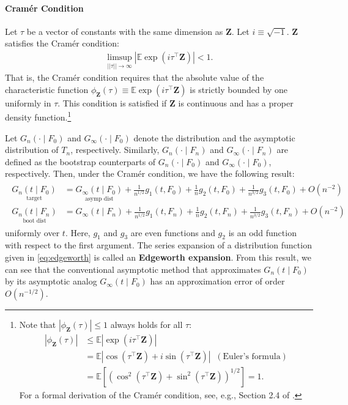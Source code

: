 \documentclass[10.5pt, A4paper, openany, uplatex]{book}
\newcommand{\mbf}{\mathbf}
\newcommand{\E}{\mathbb{E}}
\numberwithin{equation}{section}
\begin{document}
\paragraph{Cram\'{e}r Condition} 
Let $\tau$ be a vector of constants with the same dimension as $\mbf{Z}$.
Let $i \equiv \sqrt{-1}$.
$\mbf{Z}$ satisfies the Cram\'{e}r condition:
\begin{align*}
	\limsup_{||\tau || \to \infty} |\E \exp(i \tau^\top \mbf{Z})| < 1. 
\end{align*} 
That is,  the Cram\'er condition requires that the absolute value of the characteristic function $\phi_\mbf{Z}(\tau) \equiv \E \exp(i \tau^\top \mbf{Z})$ is strictly bounded by one uniformly in $\tau$.
This condition is satisfied if $\mbf{Z}$ is continuous and has a proper density function.\footnote{
	Note that $|\phi_\mbf{Z}(\tau)| \le 1$ always holds for all $\tau$:
	\begin{align*}
		|\phi_\mbf{Z}(\tau)| 
		& \le \E | \exp(i \tau^\top \mbf{Z})| \\
		& = \E |\cos(\tau^\top \mbf{Z}) + i \sin (\tau^\top \mbf{Z})| \;\; (\text{Euler's formula}) \\
		& = \E\left[  (\cos^2(\tau^\top \mbf{Z}) +  \sin^2(\tau^\top \mbf{Z}))^{1/2} \right] = 1.
	\end{align*}
	For a formal derivation of the Cram\'er condition, see, e.g., Section 2.4 of \cite{hall1992bootstrap}.
}

Let $G_n(\cdot \mid F_0)$ and $G_\infty(\cdot \mid F_0)$ denote the distribution and the asymptotic distribution of $T_n$, respectively.
Similarly, $G_n(\cdot \mid F_n)$ and $G_\infty(\cdot \mid F_n)$ are defined as the bootstrap counterparts of $G_n(\cdot \mid F_0)$ and $G_\infty(\cdot \mid F_0)$, respectively.
Then, under the Cram\'er condition, we have the following result:
\begin{align}\label{eq:edgeworth}
	\begin{split}
		\underset{\text{target}}{G_n(t \mid F_0)} & = \underset{\text{asymp dist}}{G_\infty(t \mid F_0)} + \frac{1}{n^{1/2}} g_1(t, F_0) + \frac{1}{n} g_2(t, F_0) + \frac{1}{n^{3/2}} g_3(t, F_0) + O(n^{-2}) \\
		\underset{\text{boot dist}}{G_n(t \mid F_n)} & = G_\infty(t \mid F_n) + \frac{1}{n^{1/2}} g_1(t, F_n) + \frac{1}{n} g_2(t, F_n) + \frac{1}{n^{3/2}} g_3(t, F_n) + O(n^{-2}) 
	\end{split}
\end{align}
uniformly over $t$.
Here, $g_1$ and $g_3$ are even functions and $g_2$ is an odd function with respect to the first argument.
The series expansion of a distribution function given in \eqref{eq:edgeworth} is called an \textbf{Edgeworth expansion}.
From this result, we can see that the conventional asymptotic method that approximates $G_n(t \mid F_0)$ by its asymptotic analog $G_\infty(t \mid F_0)$ has an approximation error of order $O(n^{-1/2})$.
\end{document}
